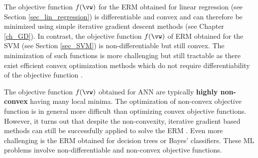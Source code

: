 \documentclass[12pt]{report}
\begin{document}
The objective function $f(\vw)$ for the ERM obtained for linear 
regression (see Section \ref{sec_lin_regression}) is differentiable 
and convex and can therefore be minimized using simple iterative 
gradient descent methods (see Chapter \ref{ch_GD}). In contrast, 
the objective function $f(\vw)$ of ERM obtained for the SVM (see 
Section \ref{sec_SVM}) is non-differentiable but still convex. The 
minimization of such functions is more challenging but still tractable 
as there exist efficient convex optimization methods which do not 
require differentiability of the objective function \cite{ProximalMethods}. 

The objective function $f(\vw)$ obtained for ANN are typically 
{\bf highly non-convex} having many local minima. The optimization 
of non-convex objective function is in general more difficult than 
optimizing convex objective functions. However, it turns out that 
despite the non-convexity, iterative gradient based methods can 
still be successfully applied to solve the ERM \cite{Goodfellow-et-al-2016}. 
Even more challenging is the ERM obtained for decision trees or 
Bayes' classifiers. These ML problems involve non-differentiable 
and non-convex objective functions. 
\end{document}
